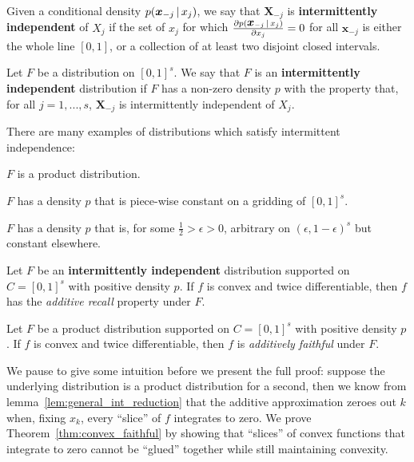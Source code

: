 \begin{definition}
Given a conditional density $p(\mbox{\boldmath $x$}_{-j} {\,|\,} x_j)$, we say that $\mathbf{X}_{-j}$ is \textbf{intermittently independent} of $X_j$ if the set of $x_j$ for which $\frac{\partial p(\mbox{\boldmath $x$}_{-j} {\,|\,} x_j)}{\partial x_j} = 0$ for all $\mathbf{x}_{-j}$ is either the whole line $[0,1]$, or a collection of at least two disjoint closed intervals.

Let $F$ be a distribution on $[0,1]^s$. We say that $F$ is an \textbf{intermittently independent} distribution if $F$ has a non-zero density $p$ with the property that, for all $j=1,...,s$, $\mathbf{X}_{-j}$ is intermittently independent of $X_j$.
\end{definition}

\begin{example} There are many examples of distributions which satisfy intermittent independence:
\begin{packed_enum}
\item $F$ is a product distribution.
\item $F$ has a density $p$ that is piece-wise constant on a gridding of $[0,1]^s$.
\item $F$ has a density $p$ that is, for some $\frac{1}{2} > \epsilon > 0$,  arbitrary on $(\epsilon, 1-\epsilon)^s$ but constant elsewhere. 
\end{packed_enum}
\end{example}

\begin{theorem}
\label{thm:convex_recall}
Let $F$ be an \textbf{intermittently independent} distribution supported on $C=[0,1]^s$ with positive density $p$. If $f$ is convex and twice differentiable, then $f$ has the \emph{additive recall} property under $F$.
\end{theorem}

\begin{theorem}
\label{thm:convex_faithful}
Let $F$ be a product distribution supported on $C=[0,1]^s$ with positive density $p$. If $f$ is convex and twice differentiable, then $f$ is \emph{additively faithful} under $F$.
\end{theorem}



We pause to give some intuition before we present the full proof: 
suppose the underlying distribution is a product distribution for a second, 
then we know from lemma~\ref{lem:general_int_reduction} that the
additive approximation zeroes out $k$ when, fixing $x_k$, every
``slice'' of $f$ integrates to zero. We prove
Theorem~\ref{thm:convex_faithful} by showing that ``slices'' of convex
functions that integrate to zero cannot be ``glued'' together while
still maintaining convexity.

